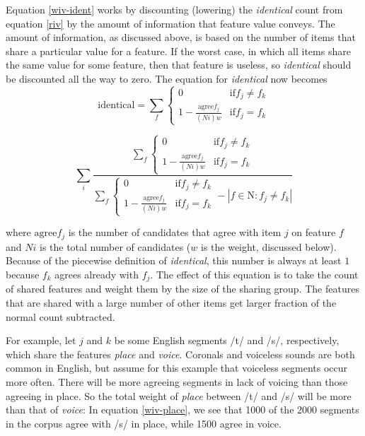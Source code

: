 \documentclass[11pt]{article}
\begin{document}
Equation \ref{wiv-ident} works by discounting (lowering)
the \textit{identical} count from equation \ref{riv} by
the amount of information that feature value conveys. The
amount of information, as discussed above, is based on the number of
items that share a particular value for a feature. If
the worst case, in which all items share the same value for some
feature, then that feature is useless, so \textit{identical} should be
discounted all the way to zero. The equation for \textit{identical} now becomes
\begin{equation}
  \textrm{identical} = \sum_f \left\{
  \begin{array}{ll}
    0 & \textrm{if} f_j \neq f_k \\
    1 - \frac{\textrm{agree}f_{j}}{(Ni)w} & \textrm{if} f_j = f_k
  \end{array} \right.
\label{wiv-ident}
\end{equation}

\begin{equation} \sum_i \frac{\sum_f \left\{
  \begin{array}{ll}
    0 & \textrm{if} f_j \neq f_k \\
    1 - \frac{\textrm{agree}f_j} {(Ni)w} & \textrm{if} f_j = f_k
\end{array} \right.}
  {\sum_f \left\{
  \begin{array}{ll}
    0 & \textrm{if} f_j \neq f_k \\
    1 - \frac{\textrm{agree}f_j} {(Ni)w} & \textrm{if} f_j = f_k
    \end{array} \right. - |f \in \textrm{N} : f_j \neq f_k|}
  \label{wiv-full}
  \end{equation}

  where $\textrm{agree}f_{j}$ is the number of candidates that agree
  with item $j$ on feature $f$ and $Ni$ is the total number of
  candidates ($w$ is the weight, discussed below). Because of the
  piecewise definition of \textit{identical}, this number is always at
  least $1$ because $f_k$ agrees already with $f_j$. The effect of
  this equation is to take the count of shared features and weight
  them by the size of the sharing group. The features that are shared
  with a large number of other items get larger fraction of the normal
  count subtracted.

For example, let $j$ and $k$ be some English segments /t/ and /s/,
respectively, which share the features \textit{place} and
\textit{voice}. Coronals
and voiceless sounds are both common in English, but assume for this
example that voiceless segments occur more often. There will be more
agreeing segments in lack of voicing than those agreeing in place. So the
total weight of \textit{place} between /t/ and /s/ will be more than
that of \textit{voice}: In equation \ref{wiv-place}, we see that 1000
of the 2000 segments in the corpus agree with /s/ in place, while 1500
agree in voice.
\end{document}
